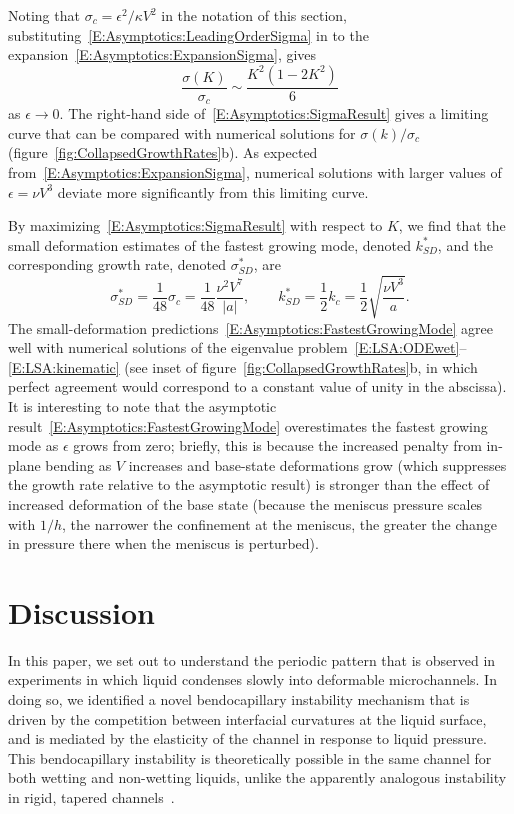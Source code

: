 \documentclass{jfm}
\newcommand{\aspect}{a} %
\begin{document}
Noting that $\sigma_c = \epsilon^2/\kappa V^2$ in the notation of this section, substituting~\eqref{E:Asymptotics:LeadingOrderSigma} in to the expansion~\eqref{E:Asymptotics:ExpansionSigma}, gives
\begin{equation}\label{E:Asymptotics:SigmaResult}
\frac{\sigma(K)}{\sigma_c} \sim  \frac{K^2\left(1-2K^2 \right)}{6}
\end{equation}
as $\epsilon \to 0$. The right-hand side of~\eqref{E:Asymptotics:SigmaResult} gives a limiting curve that can be compared with numerical solutions for $\sigma(k)/\sigma_c$ (figure~\ref{fig:CollapsedGrowthRates}b). As expected from~\eqref{E:Asymptotics:ExpansionSigma}, numerical solutions with larger values of $\epsilon = \nu V^3$ deviate more significantly from this limiting curve.

By maximizing~\eqref{E:Asymptotics:SigmaResult} with respect to $K$, we find that the small deformation estimates of the fastest growing mode, denoted $k^*_{SD}$, and the corresponding growth rate, denoted $\sigma^*_{SD}$, are
\begin{equation}\label{E:Asymptotics:FastestGrowingMode}
\sigma^*_{SD}= \frac{1}{48}\sigma_c = \frac{1}{48}\frac{\nu^2 V^7}{|\aspect|}, \qquad k^*_{SD}= \frac{1}{2}k_c = \frac{1}{2}\sqrt{\frac{\nu V^3}{\aspect}}.
\end{equation}
The small-deformation predictions~\eqref{E:Asymptotics:FastestGrowingMode} agree well with numerical solutions of the eigenvalue problem~\eqref{E:LSA:ODEwet}--\eqref{E:LSA:kinematic} (see inset of figure~\ref{fig:CollapsedGrowthRates}b, in which perfect agreement would correspond to a constant value of unity in the abscissa). It is interesting to note that the asymptotic result~\eqref{E:Asymptotics:FastestGrowingMode} overestimates the fastest growing mode as $\epsilon$ grows from zero; briefly, this is because the increased penalty from in-plane bending as $V$ increases and base-state deformations grow (which suppresses the growth rate relative to the asymptotic result) is stronger than the effect of increased deformation of the base state (because the meniscus pressure scales with $1/h$, the narrower the confinement at the meniscus, the greater the change in pressure there when the meniscus is perturbed).

\section{Discussion}\label{S:Conclusion}
In this paper, we set out to understand the periodic pattern that is observed in experiments in which liquid condenses slowly into deformable microchannels. In doing so, we identified a novel bendocapillary instability mechanism that is driven by the competition between interfacial curvatures at the liquid surface, and is mediated by the elasticity of the channel in response to liquid pressure. This bendocapillary instability is theoretically possible in the same channel for both wetting and non-wetting liquids, unlike the apparently analogous instability in rigid, tapered channels~\citep{AlHousseiny2012NaturePhysics}.
\end{document}
